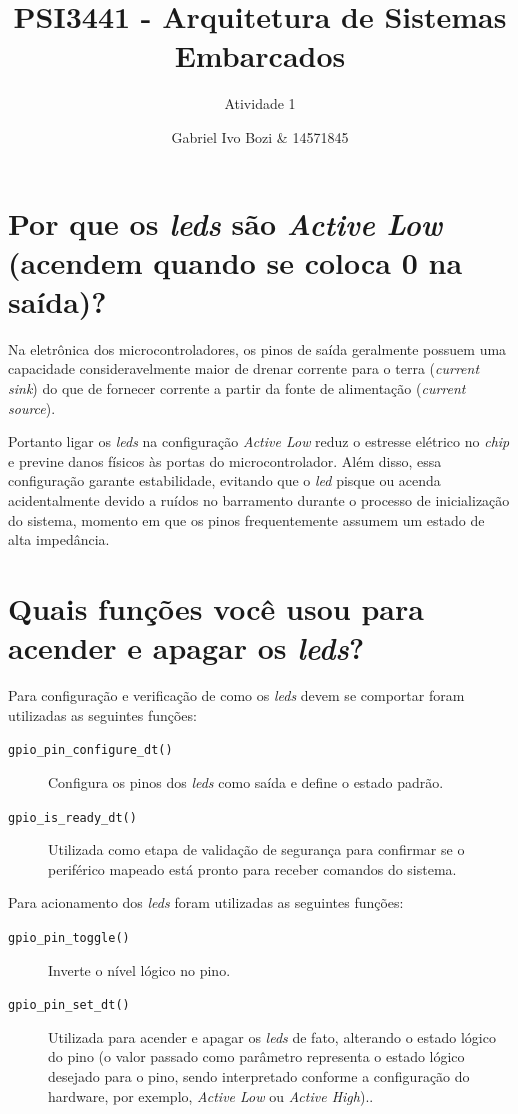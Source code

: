 \documentclass{article}
\title{PSI3441 - Arquitetura de Sistemas Embarcados}
\subtitle{Atividade 1}
\author{Gabriel Ivo Bozi & 14571845}
\begin{document}
\maketitle

\section{Por que os \textit{leds} são \textit{Active Low} (acendem quando se coloca 0 na saída)?}

    Na eletrônica dos microcontroladores, os pinos de saída geralmente possuem uma capacidade consideravelmente maior de drenar corrente para o terra (\textit{current sink}) do que de fornecer corrente a partir da fonte de alimentação (\textit{current source}). 
    
    Portanto ligar os \textit{leds} na configuração \textit{Active Low} reduz o estresse elétrico no \textit{chip} e previne danos físicos às portas do microcontrolador. Além disso, essa configuração garante estabilidade, evitando que o \textit{led} pisque ou acenda acidentalmente devido a ruídos no barramento durante o processo de inicialização do sistema, momento em que os pinos frequentemente assumem um estado de alta impedância.

\section{Quais funções você usou para acender e apagar os \textit{leds}?}

    Para configuração e verificação de como os \textit{leds} devem se comportar foram utilizadas as seguintes funções:
    
    \begin{description}
        \item[\texttt{gpio\_pin\_configure\_dt()}] Configura os pinos dos \textit{leds} como saída e define o estado padrão.
        
        \item[\texttt{gpio\_is\_ready\_dt()}] Utilizada como etapa de validação de segurança para confirmar se o periférico mapeado está pronto para receber comandos do sistema.
    \end{description}
    
    Para acionamento dos \textit{leds} foram utilizadas as seguintes funções:
    
    \begin{description}
        \item[\texttt{gpio\_pin\_toggle()}] Inverte o nível lógico no pino.
    
        \item[\texttt{gpio\_pin\_set\_dt()}] Utilizada para acender e apagar os \textit{leds} de fato, alterando o estado lógico do pino (o valor passado como parâmetro representa o estado lógico desejado para o pino, sendo interpretado conforme a configuração do hardware, por exemplo, \textit{Active Low} ou \textit{Active High}).. 
    \end{description}
\end{document}
